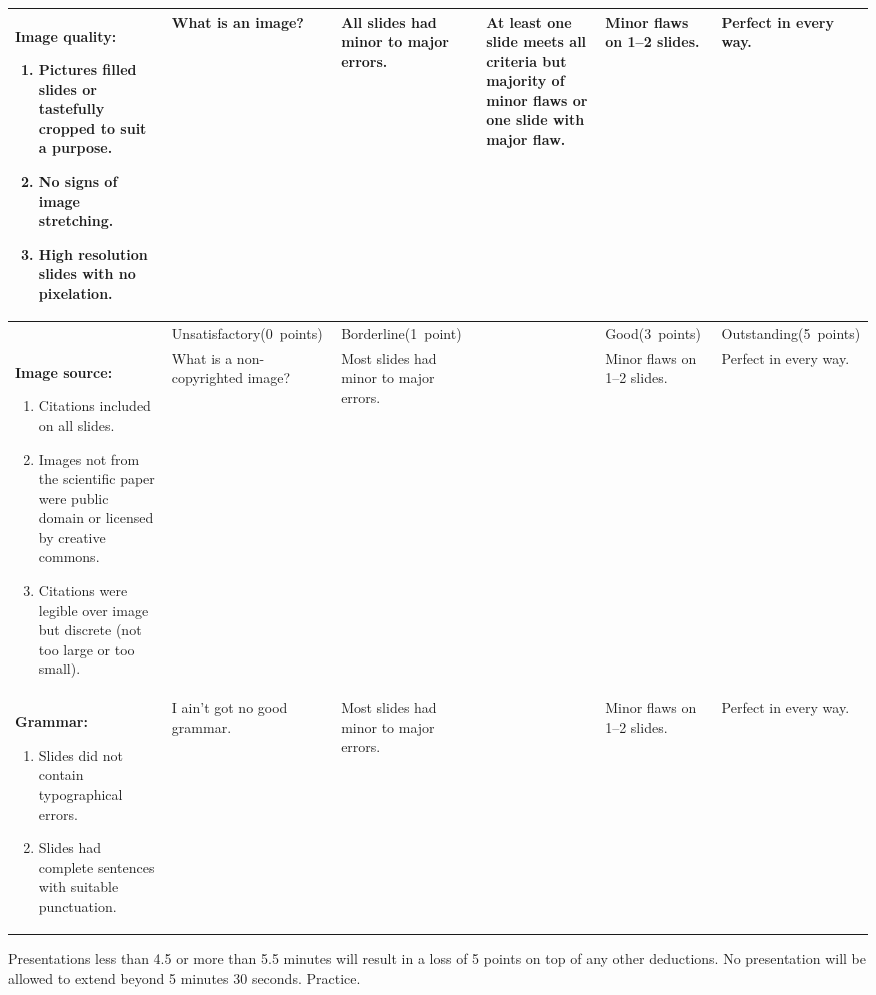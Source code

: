 \documentclass[10pt]{article}
\begin{document}
\begin{landscape}
{\begin{longtable}[l]{@{}L{7cm}L{3cm}L{3cm}L{3cm}L{3cm}L{3cm}@{}}
\textbf{Image quality:}\par%
\vspace{-0.5\baselineskip}
\begin{enumerate}[itemsep=-0.25\baselineskip,align=left, leftmargin=*]
\item Pictures filled slides or tastefully cropped to suit a purpose.%
\item No signs of image stretching.%
\item High resolution slides with no pixelation.%
\end{enumerate}&%
What is an image? &%
All slides had minor to major errors. &%
At least one slide meets all criteria but majority of minor flaws or one slide with major flaw. &%
Minor flaws on 1–2 slides.&%
Perfect in every way.%
\\[-1em]
\midrule
	& Unsatisfactory\newline (0~points) & Borderline\newline (1~point) & & Good\newline (3~points) 	& Outstanding\newline (5~points) \\
\midrule
\textbf{Image source:}\par%
\vspace{-0.5\baselineskip}
\begin{enumerate}[itemsep=-0.25\baselineskip,align=left, leftmargin=*]
\item Citations included on all slides.%
\item Images not from the scientific paper were public domain or licensed by creative commons.%
\item Citations were legible over image but discrete (not too large or too small).%
\end{enumerate}&%
What is a non-copyrighted image? &%
Most slides had minor to major errors. &%
&
Minor flaws on 1–2 slides. &%
Perfect in every way. %
\\[-1em]
\midrule
\textbf{Grammar:}\par%
\vspace{-0.5\baselineskip}
\begin{enumerate}[itemsep=-0.25\baselineskip,align=left, leftmargin=*]
	\item Slides did not contain typographical errors.%
	\item Slides had complete sentences with suitable punctuation.%
\end{enumerate}&%
I ain't got no good grammar. &%
Most slides had minor to major errors. &%
&
Minor flaws on 1–2 slides. &%
Perfect in every way. %
\\[-1em]
\bottomrule
\end{longtable}
}%
Presentations less than 4.5 or more than 5.5 minutes will result in a loss of 5 points on top of any other deductions. No presentation will be allowed to extend beyond 5 minutes 30 seconds. Practice.


\end{landscape}
\end{document}
